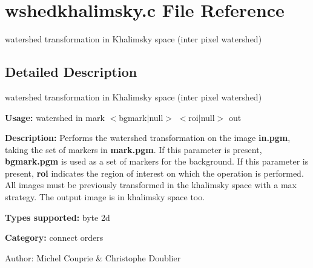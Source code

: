\section{wshedkhalimsky.c File Reference}
\label{wshedkhalimsky_8c}
watershed transformation in Khalimsky space (inter pixel watershed)  




\label{_details}
\subsection{Detailed Description}
watershed transformation in Khalimsky space (inter pixel watershed) 

{\bf Usage:} watershed in mark $<$bgmark$|$null$>$ $<$roi$|$null$>$ out

{\bf Description:} Performs the watershed transformation on the image {\bf in.pgm}, taking the set of markers in {\bf mark.pgm}. If this parameter is present, {\bf bgmark.pgm} is used as a set of markers for the background. If this parameter is present, {\bf roi} indicates the region of interest on which the operation is performed. All images must be previously transformed in the khalimsky space with a max strategy. The output image is in khalimsky space too.

{\bf Types supported:} byte 2d

{\bf Category:} connect orders

\begin{Desc}
\item[Author:]Michel Couprie \& Christophe Doublier \end{Desc}
